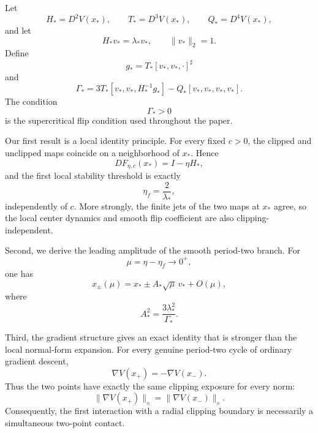 Let
\[
H_*
=
D^2V(x_*),
\qquad
T_*
=
D^3V(x_*),
\qquad
Q_*
=
D^4V(x_*),
\]
and let
\[
H_*v_*=\lambda_*v_*,
\qquad
\|v_*\|_2=1.
\]
Define
\begin{equation}
g_*
=
T_*[v_*,v_*,\cdot]^\sharp
\label{eq:intro-g}
\end{equation}
and
\begin{equation}
\Gamma_*
=
3T_*[v_*,v_*,H_*^{-1}g_*]
-
Q_*[v_*,v_*,v_*,v_*].
\label{eq:intro-Gamma}
\end{equation}
The condition
\[
\Gamma_*>0
\]
is the supercritical flip condition used throughout the paper.

Our first result is a local identity principle.  For every fixed
$c>0$, the clipped and unclipped maps coincide on a neighborhood of
$x_*$.  Hence
\begin{equation}
DF_{\eta,c}(x_*)
=
I-\eta H_*,
\label{eq:intro-local-linearization}
\end{equation}
and the first local stability threshold is exactly
\begin{equation}
\boxed{
\eta_f
=
\frac{2}{\lambda_*},
}
\label{eq:intro-threshold-box}
\end{equation}
independently of $c$.  More strongly, the finite jets of the two maps
at $x_*$ agree, so the local center dynamics and smooth flip
coefficient are also clipping-independent.

Second, we derive the leading amplitude of the smooth period-two
branch.  For
\[
\mu=\eta-\eta_f\to0^+,
\]
one has
\begin{equation}
x_\pm(\mu)
=
x_*
\pm
A_*\sqrt{\mu}\,v_*
+
O(\mu),
\label{eq:intro-amplitude}
\end{equation}
where
\begin{equation}
\boxed{
A_*^2
=
\frac{3\lambda_*^2}{\Gamma_*}.
}
\label{eq:intro-A}
\end{equation}

Third, the gradient structure gives an exact identity that is stronger
than the local normal-form expansion.  For every genuine period-two
cycle of ordinary gradient descent,
\begin{equation}
\boxed{
\nabla V(x_+)
=
-\nabla V(x_-).
}
\label{eq:intro-gradient-balance}
\end{equation}
Thus the two points have exactly the same clipping exposure for every
norm:
\[
\|\nabla V(x_+)\|_\diamond
=
\|\nabla V(x_-)\|_\diamond.
\]
Consequently, the first interaction with a radial clipping boundary is
necessarily a simultaneous two-point contact.

